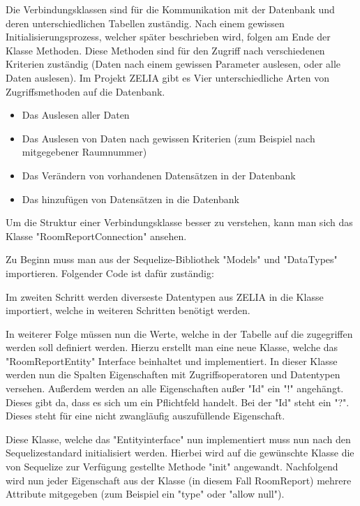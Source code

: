
Die Verbindungsklassen sind für die Kommunikation mit der Datenbank und deren unterschiedlichen Tabellen zuständig. Nach einem gewissen Initialisierungsprozess, welcher später beschrieben wird, folgen am Ende der Klasse Methoden. Diese Methoden sind für den Zugriff nach verschiedenen Kriterien zuständig (Daten nach einem gewissen Parameter auslesen, oder alle Daten auslesen). Im Projekt ZELIA gibt es Vier unterschiedliche Arten von Zugriffsmethoden auf die Datenbank.

\begin{itemize}
    \item Das Auslesen aller Daten
    \item Das Auslesen von Daten nach gewissen Kriterien (zum Beispiel nach mitgegebener Raumnummer)
    \item Das Verändern von vorhandenen Datensätzen in der Datenbank
    \item Das hinzufügen von Datensätzen in die Datenbank
\end{itemize}

Um die Struktur einer Verbindungsklasse besser zu verstehen, kann man sich das Klasse "RoomReportConnection" ansehen.

Zu Beginn muss man aus der Sequelize-Bibliothek "Models" und "DataTypes" importieren. Folgender Code ist dafür zuständig:


Im zweiten Schritt werden diverseste Datentypen aus ZELIA in die Klasse importiert, welche in weiteren Schritten benötigt werden.

In weiterer Folge müssen nun die Werte, welche in der Tabelle auf die zugegriffen werden soll definiert werden. Hierzu erstellt man eine neue Klasse, welche das "RoomReportEntity" Interface beinhaltet und implementiert. In dieser Klasse werden nun die Spalten Eigenschaften mit Zugriffsoperatoren und Datentypen versehen. Außerdem werden an alle Eigenschaften außer "Id" ein "!" angehängt. Dieses gibt da, dass es sich um ein Pflichtfeld handelt. Bei der "Id" steht ein "?". Dieses steht für eine nicht zwangläufig auszufüllende Eigenschaft.


Diese Klasse, welche das "Entityinterface" nun implementiert muss nun nach den Sequelizestandard initialisiert werden. Hierbei wird auf die gewünschte Klasse die von Sequelize zur Verfügung gestellte Methode "init" angewandt. Nachfolgend wird nun jeder Eigenschaft aus der Klasse (in diesem Fall RoomReport) mehrere Attribute mitgegeben (zum Beispiel ein "type" oder "allow null").

